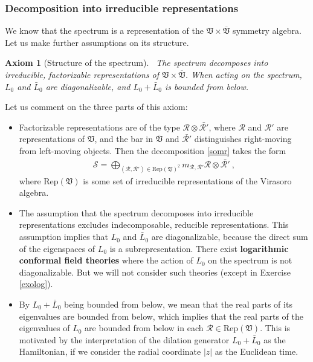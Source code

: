 \documentclass[12pt, a4paper, notitlepage, twoside]{report}
\numberwithin{equation}{section}
\theoremstyle{break}
\newtheorem{hyp}{Axiom}[chapter]
\begin{document}
\subsubsection{Decomposition into irreducible representations}

We know that the spectrum is a representation of the 
$\mathfrak{V}\times \overline{\mathfrak{V}}$ symmetry algebra.
Let us make further assumptions on its structure.

\begin{hyp}[Structure of the spectrum]
 ~\label{ax:sots}
 The spectrum decomposes into irreducible, factorizable representations of $\mathfrak{V}\times \overline{\mathfrak{V}}$. When acting on the spectrum, $L_0$ and $\bar L_0$ are diagonalizable, and $L_0+\bar L_0$ is bounded from below.
\end{hyp} 
\noindent
Let us comment on the three parts of this axiom:
\begin{itemize}
 \item 
 Factorizable representations are of the type $\mathcal{R}\otimes \bar{\mathcal{R}'}$, where $\mathcal{R}$ and $\mathcal{R}'$ are representations of $\mathfrak{V}$, and the bar in $\overline{\mathfrak{V}}$ and $\bar{\mathcal{R}'}$ distinguishes right-moving from left-moving objects. 
Then the decomposition \eqref{somr} takes the form
\begin{align}
 \boxed{\mathcal{S} = \bigoplus_{(\mathcal{R},\mathcal{R}')\in \text{Rep}(\mathfrak{V})^2} m_{\mathcal{R},\mathcal{R}'} \mathcal{R}\otimes \bar{\mathcal{R}'}}\ ,
\label{sorr}
\end{align}
where $\text{Rep}(\mathfrak{V})$ is some set of irreducible representations of the Virasoro algebra.
\item
The assumption that the spectrum decomposes into irreducible representations excludes indecomposable, reducible representations. This assumption implies that $L_0$ and $\bar L_0$ are diagonalizable, because the direct sum of the eigenspaces of $L_0$ is a subrepresentation.
There exist \textbf{\boldmath logarithmic conformal field theories} where the action of $L_0$ on the spectrum is not diagonalizable. 
But we will not consider such theories (except in Exercise \ref{exolog}).
\item 
By $L_0+\bar L_0$ being bounded from below, we mean that the real parts of its eigenvalues are bounded from below, which implies that the real parts of the eigenvalues of $L_0$ are bounded from below in each $\mathcal{R}\in\text{Rep}(\mathfrak{V})$. 
This is motivated by the interpretation of the dilation generator $L_0+\bar L_0$ as the Hamiltonian, if we consider the radial coordinate $|z|$ as the Euclidean time. 
\end{itemize}
\end{document}
